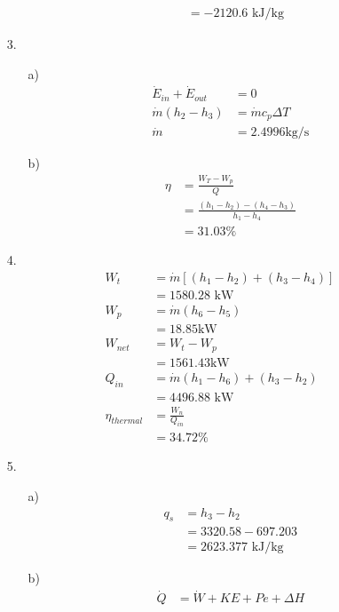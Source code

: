 \documentclass{article}
\begin{document}
\begin{itemize}
\begin{itemize}
\begin{align*}
            &=-2120.6 \text{ kJ/kg}
        \end{align*}
    \end{itemize}
    \item [3.]
    \begin{itemize}
        \item [a)]
        \begin{align*}
            \dot{ E}_{in}+\dot{E}_{out}&=0\\
            \dot{m}(h_2-h_3)&=\dot{m}c_p\Delta T\\
            \dot{m}&=2.4996 \text{kg/s}
        \end{align*}
        \item [b)]
        \begin{align*}
            \eta &=\frac{W_T-W_p}{Q}\\
            &=\frac{(h_1-h_2)-(h_4-h_3)}{h_1-h_4}\\
            &=31.03\%
        \end{align*}
    \end{itemize}
    \item [4.]
    \begin{align*}
        W_{t}&=\dot{m}[(h_1-h_2)+(h_3-h_4)]\\
        &=1580.28 \text{ kW}\\
        W_p&=\dot m (h_6-h_5)\\
        &=18.85 \text{kW}\\
        W_{net}&=W_{t}-W_{p}\\
        &=1561.43 \text{kW}\\
        Q_{in}&=\dot{m}(h_1-h_6)+(h_3-h_2)\\
        &=4496.88 \text{ kW}\\
        \eta_{thermal}&=\frac{W_n}{Q_{in}}\\
        &=34.72\%
    \end{align*}
    \item [5.]
    \begin{itemize}
        \item [a)]
        \begin{align*}
            q_s &=h_3-h_2\\
            &=3320.58-697.203\\
            &=2623.377 \text{ kJ/kg}
        \end{align*}
        \item [b)]
        \begin{align*}
            \dot Q &=\dot W +KE+Pe+\Delta H\\

\end{align*}
\end{itemize}
\end{itemize}
\end{document}
